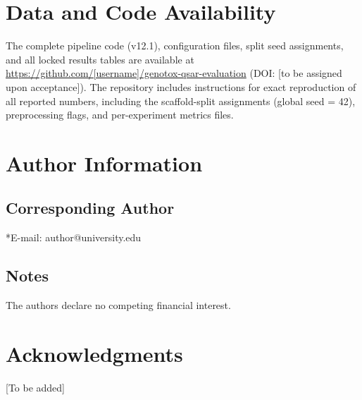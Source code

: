 \section*{Data and Code Availability}

The complete pipeline code (v12.1), configuration files, split seed assignments, and all locked results tables are available at \url{https://github.com/[username]/genotox-qsar-evaluation} (DOI: [to be assigned upon acceptance]). The repository includes instructions for exact reproduction of all reported numbers, including the scaffold-split assignments (global seed = 42), preprocessing flags, and per-experiment metrics files.

\section*{Author Information}

\subsection*{Corresponding Author}
*E-mail: author@university.edu

\subsection*{Notes}
The authors declare no competing financial interest.

\section*{Acknowledgments}

[To be added]